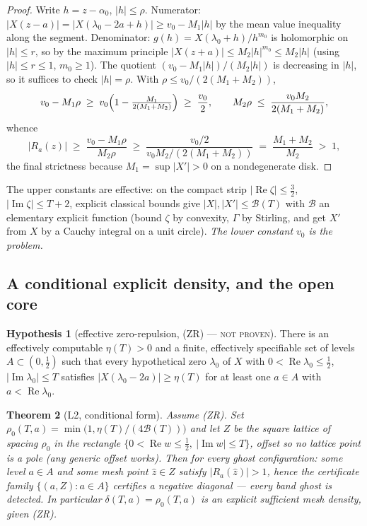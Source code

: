 \documentclass[11pt]{article}
\newtheorem{theorem}{Theorem}[section]
\theoremstyle{definition}
\newtheorem{hypothesis}[theorem]{Hypothesis}
\theoremstyle{remark}
\newcommand{\re}{\operatorname{Re}}
\newcommand{\im}{\operatorname{Im}}
\begin{document}
\begin{proof}
Write $h=z-\alpha_0$, $|h|\le\rho$. Numerator:
$|X(z-a)|=|X(\lambda_0-2a+h)|\ge v_0-M_1|h|$ by the mean value inequality
along the segment. Denominator: $g(h)=X(\lambda_0+h)/h^{m_0}$ is holomorphic
on $|h|\le r$, so by the maximum principle
$|X(z+a)|\le M_2|h|^{m_0}\le M_2|h|$ (using $|h|\le r\le1$, $m_0\ge1$).
The quotient $(v_0-M_1|h|)/(M_2|h|)$ is decreasing in $|h|$, so it suffices
to check $|h|=\rho$. With $\rho\le v_0/(2(M_1+M_2))$,
\[
v_0-M_1\rho\;\ge\;v_0\Bigl(1-\tfrac{M_1}{2(M_1+M_2)}\Bigr)\;\ge\;\frac{v_0}{2},
\qquad
M_2\rho\;\le\;\frac{v_0M_2}{2(M_1+M_2)},
\]
whence
\[
|R_a(z)|\;\ge\;\frac{v_0-M_1\rho}{M_2\rho}
\;\ge\;\frac{v_0/2}{v_0M_2/(2(M_1+M_2))}
\;=\;\frac{M_1+M_2}{M_2}\;>\;1,
\]
the final strictness because $M_1=\sup|X'|>0$ on a nondegenerate disk.
\end{proof}

The upper constants are effective: on the compact strip
$|\re\zeta|\le\tfrac32$, $|\im\zeta|\le T+2$, explicit classical bounds give
$|X|,|X'|\le\mathcal{B}(T)$ with $\mathcal{B}$ an elementary explicit
function (bound $\zeta$ by convexity, $\Gamma$ by Stirling, and get $X'$ from
$X$ by a Cauchy integral on a unit circle). \emph{The lower constant $v_0$ is
the problem.}

\subsection{A conditional explicit density, and the open core}

\begin{hypothesis}[effective zero-repulsion, {(ZR)} --- \textsc{not proven}]
\label{hyp:zr}
There is an effectively computable $\eta(T)>0$ and a finite, effectively
specifiable set of levels $A\subset(0,\tfrac12)$ such that every hypothetical
zero $\lambda_0$ of $X$ with $0<\re\lambda_0\le\tfrac12$, $|\im\lambda_0|\le T$
satisfies $|X(\lambda_0-2a)|\ge\eta(T)$ for at least one $a\in A$ with
$a<\re\lambda_0$.
\end{hypothesis}

\begin{theorem}[L2, conditional form]\label{thm:l2-conditional}
Assume (ZR). Set
$\rho_0(T,a)=\min\bigl(1,\eta(T)/(4\mathcal{B}(T))\bigr)$ and let $Z$ be the
square lattice of spacing $\rho_0$ in the rectangle
$\{0<\re w\le\tfrac12,\ |\im w|\le T\}$, offset so no lattice point is a pole
(any generic offset works). Then for every ghost configuration: some level
$a\in A$ and some mesh point $\hat z\in Z$ satisfy $|R_a(\hat z)|>1$, hence
the certificate family $\{(a,Z):a\in A\}$ certifies a negative diagonal ---
every band ghost is detected. In particular $\delta(T,a)=\rho_0(T,a)$ is an
explicit sufficient mesh density, \emph{given} (ZR).
\end{theorem}
\end{document}
